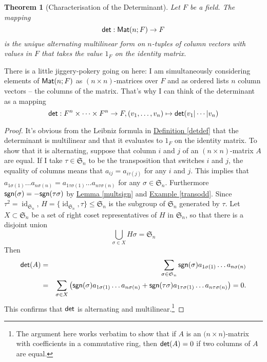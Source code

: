 \documentclass[11pt]{amsbook}
\DeclareMathOperator{\id}{\mathrm{id}}
\newtheorem{theorem}{Theorem}[section]
\theoremstyle{definition}
\begin{document}
\begin{theorem}[Characterisation of the Determinant] \label{detchar}
Let $F$ be a field. The mapping $${\sf det}:{\sf Mat}(n; F) \to F$$ is the unique alternating multilinear form on $n$-tuples of column vectors with values in $F$ that takes the value $1_F$ on the identity matrix.
\end{theorem}
There is a little jiggery-pokery going on here: I am simultaneously considering elements of ${\sf Mat}(n;F)$ as $(n\times n)$-matrices over $F$ and as ordered lists $n$ column vectors -- the columns of the matrix. That's why I can think of the determinant as a mapping $${\sf det}: F^n \times \cdots \times F^n \to F, (v_1, \ldots , v_n) \mapsto {\sf det} (v_1 | \cdots | v_n)$$
\begin{proof}
It's obvious from the Leibniz formula in \hyperref[detdef]{Definition \ref{detdef}} that the determinant is multilinear and that it evaluates to $1_F$ on the identity matrix. To show that it is alternating, suppose that column $i$ and $j$ of an $(n\times n)$-matrix $A$ are equal. If I take $\tau \in \mathfrak{S}_n$ to be the transposition that switches $i$ and $j$, the equality of columns means that $a_{ij} = a_{i \tau(j)}$ for any $i$ and $j$. This implies that $a_{1\sigma(1)} \ldots a_{n\sigma(n)} = a_{1\tau\sigma(1)} \ldots a_{n\tau\sigma(n)}$ for any $\sigma\in \mathfrak{S}_n$. Furthermore ${\sf sgn} (\sigma) = - {\sf sgn}(\tau \sigma)$ by \hyperref[multsign]{Lemma \ref{multsign}} and \hyperref[transodd]{Example \ref{transodd}}. Since $\tau^2 = \id_{\mathfrak{S}_n}$, $H = \{\id_{\mathfrak{S}_n}, \tau \}\leqslant \mathfrak{S}_n$ is the subgroup of $\mathfrak{S}_n$ generated by $\tau$. Let $X \subset \mathfrak{S}_n$ be a set of right coset representatives of $H$ in $\mathfrak{S}_n$, so that there is a disjoint union $$\bigcup_{\sigma \in X} H \sigma = \mathfrak{S}_n$$ Then \begin{eqnarray*}{\sf det} (A) &=& \sum_{\sigma \in \mathfrak{S}_n} {\sf sgn}(\sigma) a_{1\sigma(1)} \ldots a_{n\sigma(n)} \\ &=& \sum_{\sigma \in X} \left({\sf sgn}(\sigma) a_{1\sigma(1)} \ldots a_{n\sigma(n)}+ {\sf sgn}(\tau \sigma) a_{1\tau\sigma(1)} \ldots a_{n\tau\sigma(n)}\right) = 0.\end{eqnarray*} This confirms that ${\sf det}$ is alternating and multilinear.\footnote{The argument here works verbatim to show that if $A$ is an $(n\times n$)-matrix with coefficients in a commutative ring, then ${\sf det}(A) = 0$ if two columns of $A$ are equal.}


\end{proof}
\end{document}
